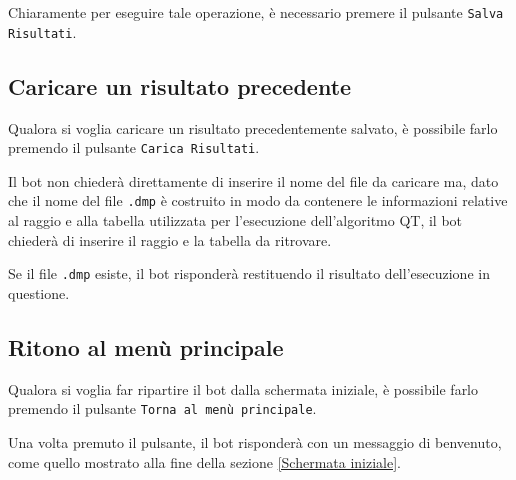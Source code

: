 
Chiaramente per eseguire tale operazione, è necessario premere il pulsante \texttt{Salva Risultati}. 


\subsection{Caricare un risultato precedente}

Qualora si voglia caricare un risultato precedentemente salvato, è possibile farlo premendo il pulsante \texttt{Carica Risultati}. 


Il bot non chiederà direttamente di inserire il nome del file da caricare ma, dato che il nome del file \texttt{.dmp} è costruito in modo da contenere le informazioni relative al raggio e alla tabella utilizzata per l'esecuzione dell'algoritmo QT, il bot chiederà di inserire il raggio e  la tabella da ritrovare. 

Se il file \texttt{.dmp} esiste, il bot risponderà restituendo il risultato dell'esecuzione in questione. 


\subsection{Ritono al menù principale}

Qualora si voglia far ripartire il bot dalla schermata iniziale, è possibile farlo premendo il pulsante \texttt{Torna al menù principale}.

Una volta premuto il pulsante, il bot risponderà con un messaggio di benvenuto, come quello mostrato alla fine della sezione \ref{Schermata iniziale}.

